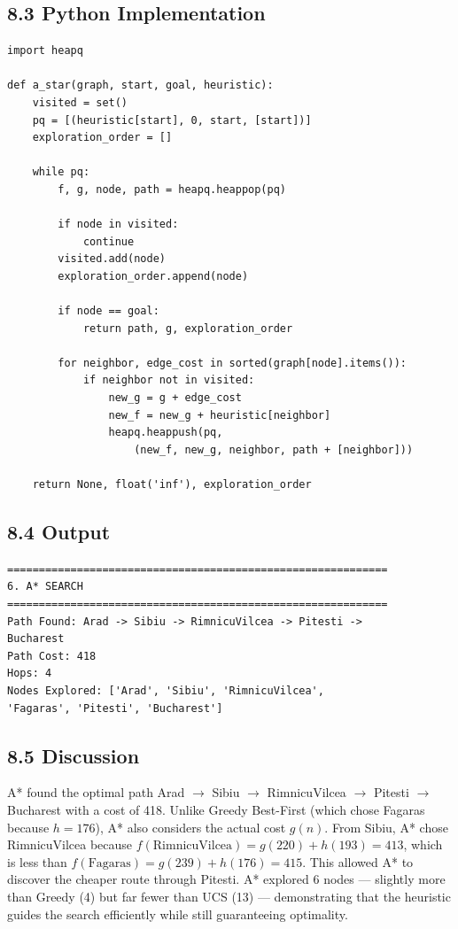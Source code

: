\documentclass[12pt,a4paper]{article}
\begin{document}
\subsection*{8.3 Python Implementation}

\begin{lstlisting}[style=plain, caption={A* Search}]
import heapq

def a_star(graph, start, goal, heuristic):
    visited = set()
    pq = [(heuristic[start], 0, start, [start])]
    exploration_order = []

    while pq:
        f, g, node, path = heapq.heappop(pq)

        if node in visited:
            continue
        visited.add(node)
        exploration_order.append(node)

        if node == goal:
            return path, g, exploration_order

        for neighbor, edge_cost in sorted(graph[node].items()):
            if neighbor not in visited:
                new_g = g + edge_cost
                new_f = new_g + heuristic[neighbor]
                heapq.heappush(pq,
                    (new_f, new_g, neighbor, path + [neighbor]))

    return None, float('inf'), exploration_order
\end{lstlisting}

\subsection*{8.4 Output}

\begin{verbatim}
============================================================
6. A* SEARCH
============================================================
Path Found: Arad -> Sibiu -> RimnicuVilcea -> Pitesti ->
Bucharest
Path Cost: 418
Hops: 4
Nodes Explored: ['Arad', 'Sibiu', 'RimnicuVilcea',
'Fagaras', 'Pitesti', 'Bucharest']
\end{verbatim}

\subsection*{8.5 Discussion}

A* found the optimal path Arad $\rightarrow$ Sibiu $\rightarrow$ RimnicuVilcea $\rightarrow$ Pitesti $\rightarrow$ Bucharest with a cost of 418. Unlike Greedy Best-First (which chose Fagaras because $h=176$), A* also considers the actual cost $g(n)$. From Sibiu, A* chose RimnicuVilcea because $f(\text{RimnicuVilcea}) = g(220) + h(193) = 413$, which is less than $f(\text{Fagaras}) = g(239) + h(176) = 415$. This allowed A* to discover the cheaper route through Pitesti. A* explored 6 nodes --- slightly more than Greedy (4) but far fewer than UCS (13) --- demonstrating that the heuristic guides the search efficiently while still guaranteeing optimality.
\end{document}
